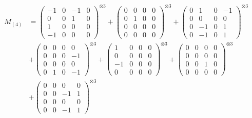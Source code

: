 \documentclass{article}
\newcommand{\Mthree}{%
    M_{(4)}
}
\begin{document}
        \newpage
        
        \footnotesize{
        \begin{align}
        \Mthree
        &= \label{Rs16-Rc11-Solution-16-c1} \begin{pmatrix} -1 & 0 & -1 & 0 \\ 0 & 0 & 1 & 0 \\ 1 & 0 & 0 & 0 \\ -1 & 0 & 0 & 0 \end{pmatrix}^{\otimes 3} 
            + \begin{pmatrix} 0 & 0 & 0 & 0 \\ 0 & 1 & 0 & 0 \\ 0 & 0 & 0 & 0 \\ 0 & 0 & 0 & 0 \end{pmatrix}^{\otimes 3} 
            + \begin{pmatrix} 0 & 1 & 0 & -1 \\ 0 & 0 & 0 & 0 \\ 0 & -1 & 0 & 1 \\ 0 & -1 & 0 & 1 \end{pmatrix}^{\otimes 3} \\
        &+ \label{Rs16-Rc11-Solution-16-c4} \begin{pmatrix} 0 & 0 & 0 & 0 \\ 0 & 0 & 0 & -1 \\ 0 & 0 & 0 & 0 \\ 0 & 1 & 0 & -1 \end{pmatrix}^{\otimes 3} 
            + \begin{pmatrix} 1 & 0 & 0 & 0 \\ 0 & 0 & 0 & 0 \\ -1 & 0 & 0 & 0 \\ 0 & 0 & 0 & 0 \end{pmatrix}^{\otimes 3} 
            + \begin{pmatrix} 0 & 0 & 0 & 0 \\ 0 & 0 & 0 & 0 \\ 0 & 0 & 1 & 0 \\ 0 & 0 & 0 & 0 \end{pmatrix}^{\otimes 3} \\
        &+ \label{Rs16-Rc11-Solution-16-c7} \begin{pmatrix} 0 & 0 & 0 & 0 \\ 0 & 0 & -1 & 1 \\ 0 & 0 & 0 & 0 \\ 0 & 0 & -1 & 1 \end{pmatrix}^{\otimes 3} 

\end{align}}
\end{document}
